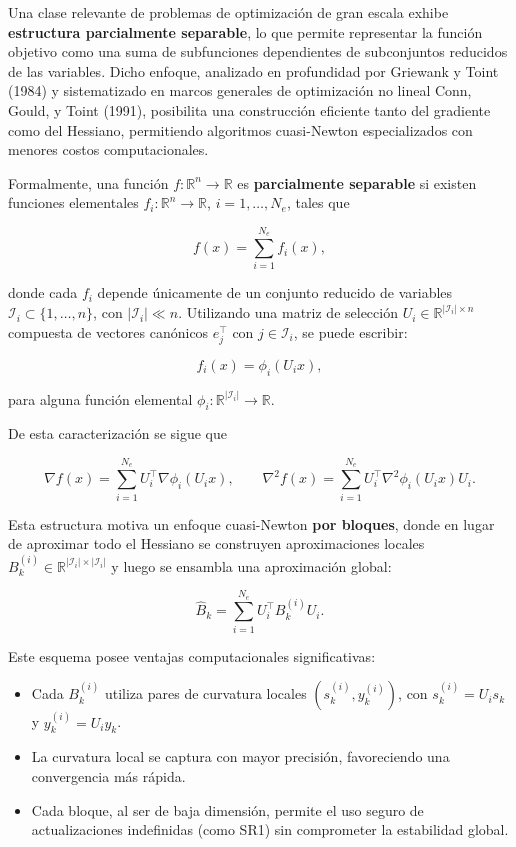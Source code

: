\documentclass[
  spanish,
  us-letterpaper,
  DIV=11,
  numbers=noendperiod]{scrreprt}
\providecommand{\tightlist}{%
  \setlength{\itemsep}{0pt}\setlength{\parskip}{0pt}}
\numberwithin{equation}{section}
\begin{document}
Una clase relevante de problemas de optimización de gran escala exhibe
\textbf{estructura parcialmente separable}, lo que permite representar
la función objetivo como una suma de subfunciones dependientes de
subconjuntos reducidos de las variables. Dicho enfoque, analizado en
profundidad por Griewank y Toint (1984) y sistematizado en marcos
generales de optimización no lineal Conn, Gould, y Toint (1991),
posibilita una construcción eficiente tanto del gradiente como del
Hessiano, permitiendo algoritmos cuasi-Newton especializados con menores
costos computacionales.

Formalmente, una función \(f:\mathbb{R}^n \to \mathbb{R}\) es
\textbf{parcialmente separable} si existen funciones elementales
\(f_i:\mathbb{R}^n\to\mathbb{R}\), \(i=1,\dots,N_e\), tales que

\[
f(x) = \sum_{i=1}^{N_e} f_i(x),
\tag{3.140}
\]

donde cada \(f_i\) depende únicamente de un conjunto reducido de
variables \(\mathcal{I}_i \subset \{1,\dots,n\}\), con
\(|\mathcal{I}_i|\ll n\). Utilizando una matriz de selección
\(U_i\in\mathbb{R}^{|\mathcal{I}_i|\times n}\) compuesta de vectores
canónicos \(e_j^\top\) con \(j\in\mathcal{I}_i\), se puede escribir:

\[
f_i(x)=\phi_i(U_i x),
\tag{3.141}
\]

para alguna función elemental
\(\phi_i:\mathbb{R}^{|\mathcal{I}_i|}\to\mathbb{R}\).

De esta caracterización se sigue que

\[
\nabla f(x)=\sum_{i=1}^{N_e} U_i^\top \nabla \phi_i(U_i x), 
\qquad
\nabla^2 f(x)=\sum_{i=1}^{N_e} U_i^\top \nabla^2 \phi_i(U_i x) U_i.
\tag{3.142}
\]

Esta estructura motiva un enfoque cuasi-Newton \textbf{por bloques},
donde en lugar de aproximar todo el Hessiano se construyen
aproximaciones locales
\(B_k^{(i)}\in\mathbb{R}^{|\mathcal{I}_i|\times|\mathcal{I}_i|}\) y
luego se ensambla una aproximación global:

\[
\widehat{B}_k = \sum_{i=1}^{N_e} U_i^\top B_k^{(i)} U_i.
\tag{3.143}
\]

Este esquema posee ventajas computacionales significativas:

\begin{itemize}
\tightlist
\item
  Cada \(B_k^{(i)}\) utiliza pares de curvatura locales
  \((s_k^{(i)},y_k^{(i)})\), con \(s_k^{(i)}=U_i s_k\) y
  \(y_k^{(i)}=U_i y_k\).
\item
  La curvatura local se captura con mayor precisión, favoreciendo una
  convergencia más rápida.
\item
  Cada bloque, al ser de baja dimensión, permite el uso seguro de
  actualizaciones indefinidas (como SR1) sin comprometer la estabilidad
  global.
\end{itemize}
\end{document}
